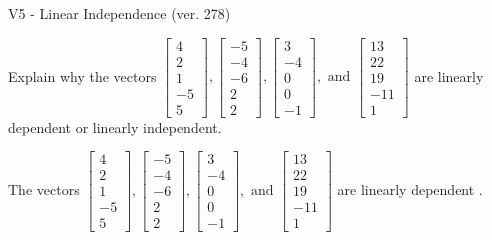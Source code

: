 \begin{exercise}
  \begin{exerciseTitle}V5 - Linear Independence (ver. 278)\end{exerciseTitle}
  \begin{exerciseStatement}
    Explain why the vectors \(\left[\begin{array}{r}
4 \\
2 \\
1 \\
-5 \\
5
\end{array}\right] , \left[\begin{array}{r}
-5 \\
-4 \\
-6 \\
2 \\
2
\end{array}\right] , \left[\begin{array}{r}
3 \\
-4 \\
0 \\
0 \\
-1
\end{array}\right] , \text{ and } \left[\begin{array}{r}
13 \\
22 \\
19 \\
-11 \\
1
\end{array}\right]\) are linearly dependent or linearly independent.	


  \end{exerciseStatement}
  \begin{exerciseAnswer}
   The vectors \(\left[\begin{array}{r}
4 \\
2 \\
1 \\
-5 \\
5
\end{array}\right] , \left[\begin{array}{r}
-5 \\
-4 \\
-6 \\
2 \\
2
\end{array}\right] , \left[\begin{array}{r}
3 \\
-4 \\
0 \\
0 \\
-1
\end{array}\right] , \text{ and } \left[\begin{array}{r}
13 \\
22 \\
19 \\
-11 \\
1
\end{array}\right]\) are 
  	 linearly dependent  .
  


  \end{exerciseAnswer}
\end{exercise}